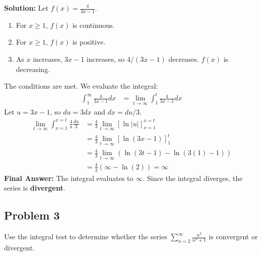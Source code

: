\documentclass{article}
\begin{document}
\textbf{Solution:}
Let $f(x) = \frac{4}{3x-1}$.
\begin{enumerate}
    \item For $x \ge 1$, $f(x)$ is continuous.
    \item For $x \ge 1$, $f(x)$ is positive.
    \item As $x$ increases, $3x-1$ increases, so $4/(3x-1)$ decreases. $f(x)$ is decreasing.
\end{enumerate}
The conditions are met. We evaluate the integral:
\begin{align*}
    \int_1^\infty \frac{4}{3x-1} dx &= \lim_{t \to \infty} \int_1^t \frac{4}{3x-1} dx
\end{align*}
Let $u = 3x-1$, so $du = 3dx$ and $dx = du/3$.
\begin{align*}
    \lim_{t \to \infty} \int_{x=1}^{x=t} \frac{4}{u} \frac{du}{3} &= \frac{4}{3} \lim_{t \to \infty} \left[ \ln|u| \right]_{x=1}^{x=t} \\
    &= \frac{4}{3} \lim_{t \to \infty} \left[ \ln(3x-1) \right]_1^t \\
    &= \frac{4}{3} \lim_{t \to \infty} (\ln(3t-1) - \ln(3(1)-1)) \\
    &= \frac{4}{3} (\infty - \ln(2)) = \infty
\end{align*}
\textbf{Final Answer:} The integral evaluates to $\infty$. Since the integral diverges, the series is \textbf{divergent}.

\subsection*{Problem 3}
Use the integral test to determine whether the series $\sum_{n=2}^{\infty} \frac{n^2}{n^3+1}$ is convergent or divergent.
\end{document}
